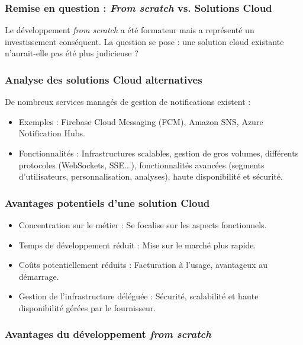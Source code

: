 \subsubsection{Remise en question : {\it From scratch} vs. Solutions Cloud}

Le développement {\it from scratch} a été formateur mais a représenté un investissement conséquent. La question se pose : {\bt une solution cloud existante n'aurait-elle pas été plus judicieuse ?}

\subsubsection{Analyse des solutions Cloud alternatives}

De nombreux services managés de gestion de notifications existent :

\begin{itemize}
\item {\bt Exemples :} Firebase Cloud Messaging (FCM), Amazon SNS, Azure
Notification Hubs.
\item {\bt Fonctionnalités :} Infrastructures scalables, gestion de gros
volumes, différents protocoles (WebSockets, SSE...), fonctionnalités avancées
(segments d'utilisateurs, personnalisation, analyses), haute disponibilité et
sécurité.
\end{itemize}

\subsubsection{Avantages potentiels d'une solution Cloud}

\begin{itemize}
\item {\bt Concentration sur le métier :} Se focalise sur les aspects fonctionnels.
\item {\bt Temps de développement réduit :} Mise sur le marché plus rapide.
\item {\bt Coûts potentiellement réduits :} Facturation à l'usage, avantageux
au démarrage.
\item {\bt Gestion de l'infrastructure déléguée :} Sécurité, scalabilité et
haute disponibilité gérées par le fournisseur.
\end{itemize}

\subsubsection{Avantages du développement {\it from scratch}}

